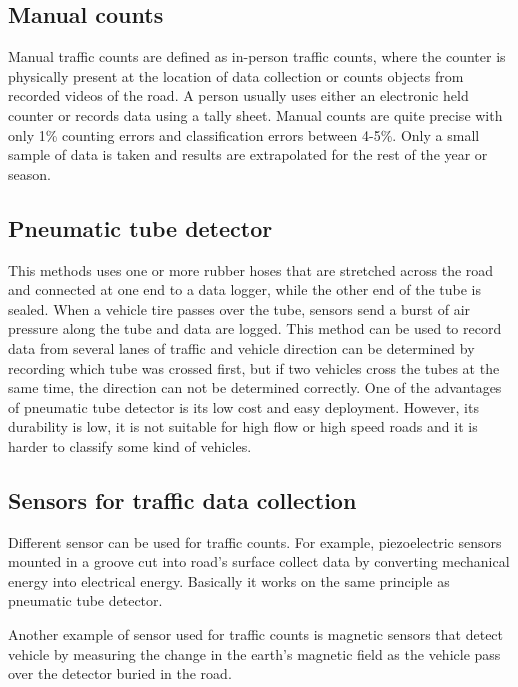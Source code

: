 \documentclass[twoside]{ctuthesis}
\theoremstyle{plain}
\theoremstyle{definition}
\theoremstyle{note}
\begin{document}
\subsection{Manual counts}
Manual traffic counts are defined as in-person traffic counts, where the counter is physically present at the location of data collection 
 or counts objects from recorded videos of the road. A person usually uses either an electronic held counter or records data using a tally sheet. Manual counts are quite precise with only 1\% counting errors and classification errors between 4-5\%\cite{zheng_mike_2012}. 
 Only a small sample of data is taken and results are extrapolated for the rest of the year or season.  
 
\subsection{Pneumatic tube detector}
This methods uses one or more rubber hoses that are stretched  across the road and connected at one end to a data logger, while the other end of the tube is sealed. When a vehicle tire passes over the tube, sensors send a burst of air pressure along the tube and data are logged. This method can be used to record data from several lanes of traffic and vehicle direction can be determined by recording which tube was crossed first, but if two vehicles cross the tubes at the same time, the direction can not be determined correctly. One of the advantages of pneumatic tube detector is its low cost and easy deployment. However, its durability is low, it is not suitable for high flow or high speed roads and it is harder to classify some kind of vehicles\cite{point}.

\subsection{Sensors for traffic data collection}
Different sensor can be used for traffic counts. For example, piezoelectric sensors mounted in a groove cut into road's surface collect data by converting mechanical energy into electrical energy\cite{windmillsoftware2018}.
 Basically it works on the same principle as pneumatic tube detector.
 
 Another example of sensor used for traffic counts is magnetic sensors that detect vehicle by measuring the change in the earth's magnetic field as the vehicle pass over the detector buried in the road\cite{windmillsoftware2018}.
 
\end{document}
